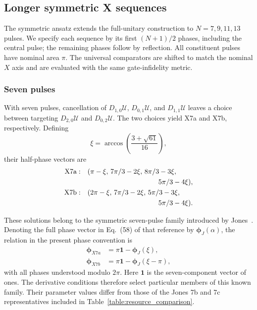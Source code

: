 \documentclass[10pt,aps,twocolumn,pra,floatfix,superscriptaddress]{revtex4-2}
\begin{document}
\subsection{Longer symmetric X sequences}

The symmetric ansatz extends the full-unitary construction to $N=7,9,11,13$ pulses. We specify each sequence by its first $(N+1)/2$ phases, including the central pulse; the remaining phases follow by reflection. All constituent pulses have nominal area $\pi$. The universal comparators are shifted to match the nominal $X$ axis and are evaluated with the same gate-infidelity metric.

\subsubsection{Seven pulses}
\label{X7}
With seven pulses, cancellation of $D_{1,0}\mathcal U$, $D_{0,1}\mathcal U$, and $D_{1,1}\mathcal U$ leaves a choice between targeting $D_{2,0}\mathcal U$ and $D_{0,2}\mathcal U$. The two choices yield X7a and X7b, respectively. Defining
\begin{equation}
\xi=\arccos\!\left(\frac{3+\sqrt{61}}{16}\right),
\end{equation}
their half-phase vectors are
\begin{align}
\text{X7a}:\quad &(\pi-\xi,\,7\pi/3-2\xi,\,8\pi/3-3\xi,\notag\\
&\hspace{36mm}5\pi/3-4\xi),\label{X7a}\\
\text{X7b}:\quad &(2\pi-\xi,\,7\pi/3-2\xi,\,5\pi/3-3\xi,\notag\\
&\hspace{36mm}5\pi/3-4\xi).\label{X7b}
\end{align}

These solutions belong to the symmetric seven-pulse family
introduced by Jones~\cite{Jones_2013_NOT}. Denoting the full
phase vector in Eq.~(58) of that reference by
$\boldsymbol{\phi}_J(\alpha)$, the relation in the present
phase convention is
\begin{align*}
\boldsymbol{\phi}_{X7a}
&=\pi\mathbf{1}-\boldsymbol{\phi}_J(\xi),\\
\boldsymbol{\phi}_{X7b}
&=\pi\mathbf{1}-\boldsymbol{\phi}_J(\xi-\pi),
\end{align*}
with all phases understood modulo $2\pi$. Here $\mathbf{1}$
is the seven-component vector of ones. The derivative
conditions therefore select particular members of this
known family. Their parameter values differ from those of
the Jones 7b and 7c representatives included in
Table~\ref{table:resource_comparison}.
\end{document}
